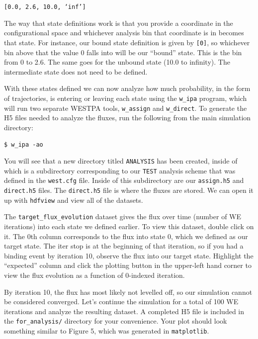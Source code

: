 \documentclass[9pt,tutorial,ASAPversion]{livecoms}
\begin{document}
\verb|[0.0, 2.6, 10.0, ‘inf’]|
 
The way that state definitions work is that you provide a coordinate in the configurational space and whichever analysis bin that coordinate is in becomes that state. 
For instance, our bound state definition is given by \verb|[0]|, so whichever bin above that the value 0 falls into will be our “bound” state. 
This is the bin from 0 to 2.6. 
The same goes for the unbound state (10.0 to infinity). 
The intermediate state does not need to be defined.

With these states defined we can now analyze how much probability, in the form of trajectories, is entering or leaving each state using the \verb|w_ipa| program, which will run two separate WESTPA tools, \verb|w_assign| and \verb|w_direct|. 
To generate the H5 files needed to analyze the fluxes, run the following from the main simulation directory:
 
\verb|$ w_ipa -ao|

You will see that a new directory titled \verb|ANALYSIS| has been created, inside of which is a subdirectory corresponding to our \verb|TEST| analysis scheme that was defined in the \verb|west.cfg| file. 
Inside of this subdirectory are our \verb|assign.h5| and \verb|direct.h5| files. 
The \verb|direct.h5| file is where the fluxes are stored. 
We can open it up with \verb|hdfview| and view all of the datasets.
 
The \verb|target_flux_evolution| dataset gives the flux over time (number of WE iterations) into each state we defined earlier. 
To view this dataset, double click on it. 
The 0th column corresponds to the flux into state 0, which we defined as our target state. 
The iter stop is at the beginning of that iteration, so if you had a binding event by iteration 10, observe the  flux into our target state. 
Highlight the “expected” column and click the plotting button in the upper-left hand corner to view the flux evolution as a function of 0-indexed iteration.
 
By iteration 10, the flux has most likely not levelled off, so our simulation cannot be considered converged. 
Let’s continue the simulation for a total of 100 WE iterations and analyze the resulting dataset. 
A completed H5 file is included in the \verb|for_analysis/| directory for your convenience.
Your plot should look something similar to Figure 5, which was generated in \verb|matplotlib|. 
\end{document}
